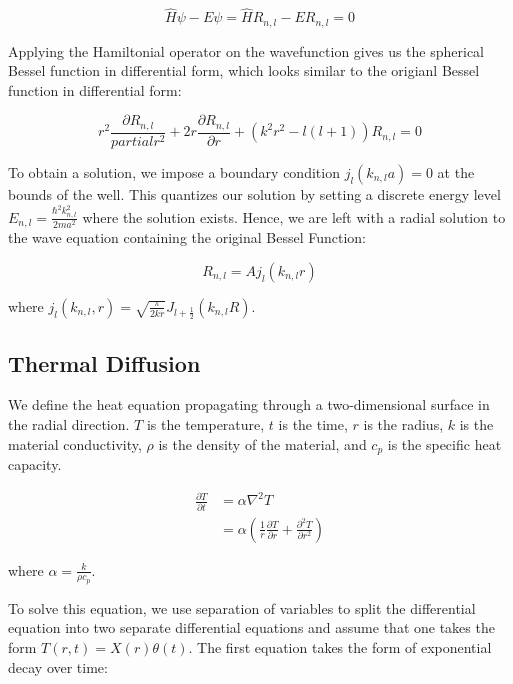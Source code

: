 \documentclass[linenumbers, RNAAS, trackchanges]{aastex631}
\begin{document}
\begin{equation}
    \hat{H}\psi-E\psi=\hat{H}R_{n,l}-ER_{n,l}=0
\end{equation}

\noindent Applying the Hamiltonial operator on the wavefunction gives us the
spherical Bessel function in differential form, which looks similar to the
origianl Bessel function in differential form:

\begin{equation}
    r^2\frac{\partial R_{n,l}}{partial r^2} + 2r\frac{\partial R_{n,l}}{\partial r} +(k^2r^2-l(l+1))R_{n,l}=0
\end{equation}

\noindent To obtain a solution, we impose a boundary condition $j_l(k_{n,l}a)=0$ at the
bounds of the well. This quantizes our solution by setting a discrete energy
level $E_{n,l}=\frac{\hbar^2k_{n,l}^2}{2ma^2}$ where the solution exists. Hence,
we are left with a radial solution to the wave equation containing the original
Bessel Function:

\begin{equation}
    R_{n,l}=Aj_l(k_{n,l}r)
\end{equation}

\noindent where $j_l(k_{n,l},r)=\sqrt{\frac{\pi}{2kr}}J_{l+\frac{1}{2}}(k_{n,l}R)$.

\subsection{Thermal Diffusion}

We define the heat equation propagating through a two-dimensional surface in
the radial direction. $T$ is the temperature, $t$ is the time, $r$ is the radius,
$k$ is the material conductivity, $\rho$ is the density of the material, and $c_p$
is the specific heat capacity.

\begin{align}
    \frac{\partial T}{\partial t}&=\alpha\nabla^2T\\
    &=\alpha\left(\frac{1}{r} \frac{\partial T}{\partial r} + \frac{\partial^2 T}{\partial r^2}\right)
\end{align}

\noindent where $\alpha=\frac{k}{\rho c_p}$.

To solve this equation, we use separation of variables to split the 
differential equation into two separate differential equations and assume
that one takes the form $T(r,t)=X(r)\theta(t)$. The first equation takes the
form of exponential decay over time:
\end{document}
